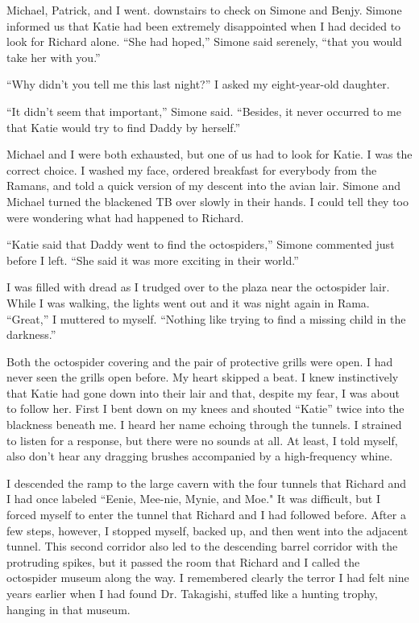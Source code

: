 \documentclass[]{article}
\begin{document}
Michael, Patrick, and I went.  downstairs to check on Simone and Benjy.  Simone informed us that Katie had been extremely disappointed when I had decided to look for Richard alone.  “She had hoped,” Simone said serenely, “that you would take her with you.”

“Why didn’t you tell me this last night?” I asked my eight-year-old daughter.

“It didn’t seem that important,” Simone said.  “Besides, it never occurred to me that Katie would try to find Daddy by herself.”

Michael and I were both exhausted, but one of us had to look for Katie.  I was the correct choice.  I washed my face, ordered breakfast for everybody from the Ramans, and told a quick version of my descent into the avian lair.  Simone and Michael turned the blackened TB over slowly in their hands.  I could tell they too were wondering what had happened to Richard.

“Katie said that Daddy went to find the octospiders,” Simone commented just before I left.  “She said it was more exciting in their world.”

I was filled with dread as I trudged over to the plaza near the octospider lair.  While I was walking, the lights went out and it was night again in Rama.  “Great,” I muttered to myself.  “Nothing like trying to find a missing child in the darkness.”

Both the octospider covering and the pair of protective grills were open.  I had never seen the grills open before.  My heart skipped a beat.  I knew instinctively that Katie had gone down into their lair and that, despite my fear, I was about to follow her.  First I bent down on my knees and shouted “Katie” twice into the blackness beneath me.  I heard her name echoing through the tunnels.  I strained to listen for a response, but there were no sounds at all.  At least, I told myself, also don’t hear any dragging brushes accompanied by a high-frequency whine.

I descended the ramp to the large cavern with the four tunnels that Richard and I had once labeled “Eenie, Mee-nie, Mynie, and Moe."  It was difficult, but I forced myself to enter the tunnel that Richard and I had followed before.  After a few steps, however, I stopped myself, backed up, and then went into the adjacent tunnel.  This second corridor also led to the descending barrel corridor with the protruding spikes, but it passed the room that Richard and I called the octospider museum along the way.  I remembered clearly the terror I had felt nine years earlier when I had found Dr.  Takagishi, stuffed like a hunting trophy, hanging in that museum.
\end{document}
